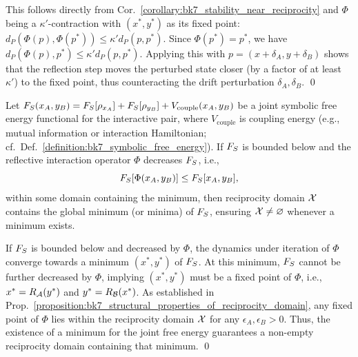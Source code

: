 \begin{demonstratio}
\label{demonstratio:bk7_perturbation_contraction_recovery}
This follows directly from Cor.~\ref{corollary:bk7_stability_near_reciprocity} and \(\Phi\) being a \(\kappa'\)-contraction with \((x^{\ast}, y^{\ast})\) as its fixed point: \(d_P(\Phi(p), \Phi(p^*)) \le \kappa' d_P(p, p^*)\). Since \(\Phi(p^*) = p^*\), we have \(d_P(\Phi(p), p^*) \le \kappa' d_P(p, p^*)\). Applying this with \(p = (x+\delta_A, y+\delta_B)\) shows that the reflection step moves the perturbed state closer (by a factor of at least \(\kappa'\)) to the fixed point, thus counteracting the drift perturbation \(\delta_A, \delta_B\). \qed
\end{demonstratio}
\begin{lemma}
\label{lemma:bk7_non_triviality_via_convergence_potential}
Let \(F_S(x_A, y_B) = F_S[\rho_{x_A}] + F_S[\rho_{y_B}] + V_{\mathrm{couple}}(x_A, y_B)\) be a joint symbolic free energy functional for the interactive pair, where \(V_{\mathrm{couple}}\) is coupling energy (e.g., mutual information or interaction Hamiltonian; cf.~Def.~\ref{definition:bk7_symbolic_free_energy}).
If \(F_S\) is bounded below and the reflective interaction operator \(\Phi\) decreases \(F_S\), i.e.,
\[
F_S[\Phi(x_A, y_B)] \le F_S[x_A, y_B],
\]
within some domain containing the minimum, then reciprocity domain \(\mathcal{X}\) contains the global minimum (or minima) of \(F_S\), ensuring \(\mathcal{X} \neq \varnothing\) whenever a minimum exists.
\end{lemma}
\begin{demonstratio}
\label{demonstratio:bk7_free_energy_minimum_in_reciprocity_domain}
If \(F_S\) is bounded below and decreased by \(\Phi\), the dynamics under iteration of \(\Phi\) converge towards a minimum \((x^{\ast}, y^{\ast})\) of \(F_S\). At this minimum, \(F_S\) cannot be further decreased by \(\Phi\), implying \((x^{\ast}, y^{\ast})\) must be a fixed point of \(\Phi\), i.e., \(x^{\ast} = R_{\mathcal{A}}(y^{\ast})\) and \(y^{\ast} = R_{\mathcal{B}}(x^{\ast})\). As established in Prop.~\ref{proposition:bk7_structural_properties_of_reciprocity_domain}, any fixed point of \(\Phi\) lies within the reciprocity domain \(\mathcal{X}\) for any \(\epsilon_A, \epsilon_B > 0\). Thus, the existence of a minimum for the joint free energy guarantees a non-empty reciprocity domain containing that minimum. \qed \end{demonstratio}
